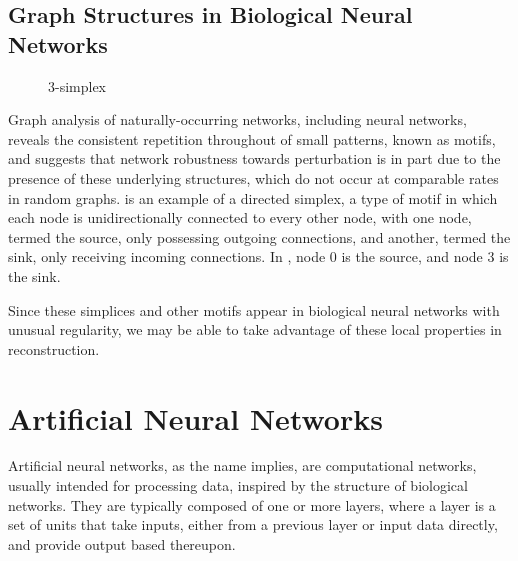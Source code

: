 \subsection{Graph Structures in Biological Neural Networks}
\label{subsec:motifs}
\begin{wrapfigure}[6]{l}{.3\textwidth}
	\centering
	\vspace{-12pt}
	{\scalebox{.9}{}}
	\caption{3-simplex}
	\label{fig:3simplex}
\end{wrapfigure}
Graph analysis of naturally-occurring networks, including neural networks, 
reveals the consistent repetition throughout of small patterns, known as motifs, 
and suggests that network robustness towards perturbation is in part due to the 
presence of these underlying structures, which do not occur at comparable rates 
in random graphs.\cite{Milo824, netmotifs-robustness}  is an 
example of a directed simplex, a type of motif in which each node is 
unidirectionally connected to every other node, with one node, termed the 
source, only possessing outgoing connections, and another, termed the sink, only 
receiving incoming connections.  In , node 0 is the source, 
and node 3 is the sink.

Since these simplices and other motifs appear in biological neural networks with 
unusual regularity\cite{Reimann2017}, we may be able to take advantage of these 
local properties in reconstruction.



\section{Artificial Neural Networks}
Artificial neural networks, as the name implies, are computational networks, 
usually intended for processing data, inspired by the structure of biological 
networks. They are typically composed of one or more layers, where a layer is a 
set of units that take inputs, either from a previous layer or input data 
directly, and provide output based thereupon. 

